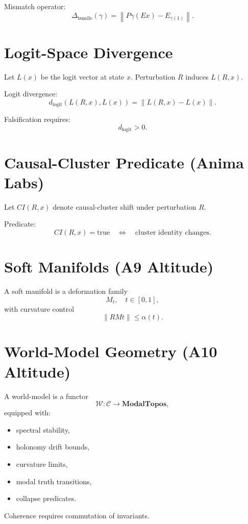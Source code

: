 \documentclass[11pt]{article}
\begin{document}
Mismatch operator:
\[
\Delta_{\mathrm{bundle}}(\gamma) =
\left\| P\gamma(Ex) - E_{\gamma(1)} \right\|.
\]

\section{Logit-Space Divergence}

Let $L(x)$ be the logit vector at state $x$.
Perturbation $R$ induces $L(R,x)$.

Logit divergence:
\[
d_{\mathrm{logit}}(L(R,x), L(x)) =
\| L(R,x) - L(x) \|.
\]

Falsification requires:
\[
d_{\mathrm{logit}} > 0.
\]

\section{Causal-Cluster Predicate (Anima Labs)}

Let $CI(R,x)$ denote causal-cluster shift under perturbation $R$.

Predicate:
\[
CI(R,x) = \mathrm{true}
\quad \Longleftrightarrow \quad
\text{cluster identity changes}.
\]

\section{Soft Manifolds (A9 Altitude)}

A soft manifold is a deformation family
\[
M_t, \quad t \in [0,1],
\]
with curvature control
\[
\|R{Mt}\| \leq \alpha(t).
\]

\section{World-Model Geometry (A10 Altitude)}

A world-model is a functor
\[
\mathcal{W} : \mathcal{C} \to \mathbf{ModalTopos},
\]
equipped with:

\begin{itemize}
    \item spectral stability,
    \item holonomy drift bounds,
    \item curvature limits,
    \item modal truth transitions,
    \item collapse predicates.
\end{itemize}

Coherence requires commutation of invariants.
\end{document}
